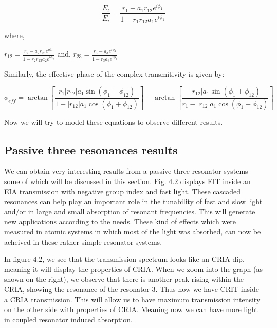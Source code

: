 \begin{equation}
\frac{E_{t}}{E_{i}} = \frac{r_{1} - a_{1} r_{12} e^{i\phi_{1}}}{1 - r_{1} r_{12} a_{1} e^{i\phi_{1}}}
\end{equation}

where, 
\begin{center}

$r_{12} = \frac{r_{2} - a_{2} r_{23} e^{i \phi_{2}}} {1 - r_{2} r_{23} a_{2} e^{i \phi_{2}}} $
and,
$r_{23} = \frac{r_{3} - a_{3} e^{i \phi_{3}}} {1 - r_{3} a_{3} e^{i \phi_{3}}} $

\end{center}

Similarly, the effective phase of the complex transmitivity is given by:

\begin{equation}
\phi_{eff} = \arctan[{\frac{r_{1} |r_{12}| a_{1} \sin{(\phi_{1} + \phi_{12})}}{1 - |r_{12}| a_{1} \cos{(\phi_{1} + \phi_{12})}}}] - \arctan[{\frac{|r_{12}| a_{1} \sin{(\phi_{1} + \phi_{12})}}{r_{1} - |r_{12}| a_{1} \cos{(\phi_{1} + \phi_{12})}}}]
\end{equation}

Now we will try to model these equations to observe different results.

\subsection{Passive three resonances results}
We can obtain very interesting results from a passive three resonator systems some of which will be discussed in this section. Fig. 4.2 displays EIT inside an EIA transmission with negative group index and fast light. These cascaded resonances can help play an important role in the tunability of fast and slow light and/or in large and small absorption of resonant frequencies. This will generate new applications according to the needs. These kind of effects which were measured in atomic systems in which most of the light was absorbed, can now be acheived in these rather simple resonator systems. 

In figure 4.2, we see that the transmission spectrum looks like an CRIA dip, meaning it will display the properties of CRIA. When we zoom into the graph (as shown on the right), we observe that there is another peak rising within the CRIA, showing the resonance of the resonator 3. Thus now we have CRIT inside a CRIA transmission. This will allow us to have maximum transmission intensity on the other side with properties of CRIA. Meaning now we can have more light in coupled resonator induced absorption.

